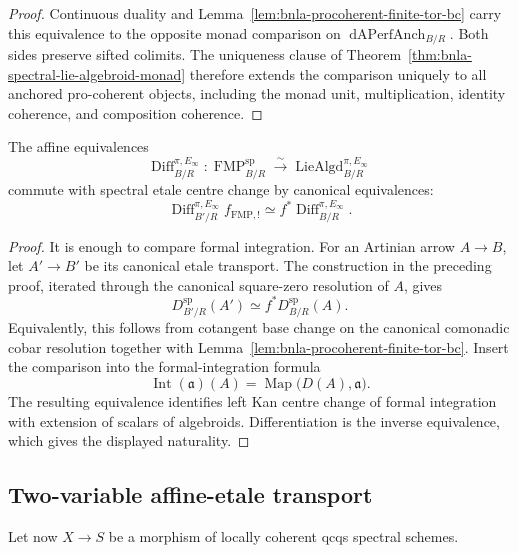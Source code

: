 \begin{proof}
Continuous duality and
Lemma~\ref{lem:bnla-procoherent-finite-tor-bc} carry this equivalence to the
opposite monad comparison on
$\operatorname{dAPerfAnch}_{B/R}$.  Both sides preserve sifted colimits.
The uniqueness clause of
Theorem~\ref{thm:bnla-spectral-lie-algebroid-monad} therefore extends the
comparison uniquely to all anchored pro-coherent objects, including the monad
unit, multiplication, identity coherence, and composition coherence.
\end{proof}

\begin{theorem}
\label{thm:bnla-affine-spectral-recognition-etale}
The affine equivalences
\[
    \operatorname{Diff}^{\pi,E_\infty}_{B/R}:
    \operatorname{FMP}^{\mathrm{sp}}_{B/R}
    \xrightarrow{\sim}
    \operatorname{LieAlgd}^{\pi,E_\infty}_{B/R}
\]
commute with spectral etale centre change by canonical equivalences:
\[
\boxed{
    \operatorname{Diff}^{\pi,E_\infty}_{B'/R}
    f_{\mathrm{FMP},!}
    \simeq
    f^*
    \operatorname{Diff}^{\pi,E_\infty}_{B/R}.}
\]
\end{theorem}

\begin{proof}
It is enough to compare formal integration.  For an Artinian arrow
$A\to B$, let $A'\to B'$ be its canonical etale transport.  The construction
in the preceding proof, iterated through the canonical square-zero
resolution of $A$, gives
\[
\boxed{
    D^{\mathrm{sp}}_{B'/R}(A')
    \simeq
    f^*D^{\mathrm{sp}}_{B/R}(A).}
\]
Equivalently, this follows from cotangent base change on the canonical
comonadic cobar resolution together with
Lemma~\ref{lem:bnla-procoherent-finite-tor-bc}.  Insert the comparison into
the formal-integration formula
\[
    \operatorname{Int}(\mathfrak a)(A)
    =
    \operatorname{Map}
    \bigl(D(A),\mathfrak a\bigr).
\]
The resulting equivalence identifies left Kan centre change of formal
integration with extension of scalars of algebroids.  Differentiation is the
inverse equivalence, which gives the displayed naturality.
\end{proof}

\subsection{Two-variable affine-etale transport}

Let now $X\to S$ be a morphism of locally coherent qcqs spectral schemes.

